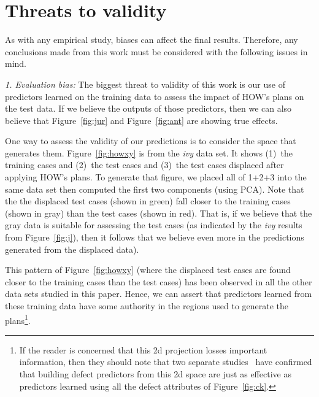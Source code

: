 \documentclass[conference]{IEEEtran}
\newcommand{\fig}[1]{Figure~\ref{fig:#1}}
\begin{document}
\section{Threats to validity}

 

As with any empirical study, biases can affect the final results. Therefore, any
conclusions made from this work must be considered with the following issues in
mind.


{\em 1. Evaluation bias:} The biggest threat to validity of this work is our use
of predictors learned on the training data to assess the impact of HOW's plans
on the test data.
If we believe the outputs of those predictors, then we can also believe that
\fig{jur} and \fig{ant} are showing true effects.  

One way to assess the validity of our predictions is to consider the space that generates
them. \fig{howxy} is from the {\em ivy} data
set. It shows (1)~the training cases and (2)~the test cases and (3)~the
test cases displaced after applying HOW's plans.
To generate that figure, we placed all of 1+2+3 into the same data set then computed the first
two  components (using PCA). Note that the  the   displaced test
cases  (shown in green)  fall closer to the training cases (shown in gray) than
the test cases (shown in red).  That is, if we believe
that the gray data is  suitable for assessing
the test cases (as indicated by the {\em ivy} results from \fig{j}), then it follows
that we believe even more in the predictions
generated from the displaced data).

This pattern of \fig{howxy} (where the displaced test cases are found closer to  the training cases than the test cases) has been observed in all the other data sets studied in this
paper. Hence,  we can assert that
predictors learned from these training data have some authority in the regions
used to generate the plans\footnote{If the reader is concerned that this 2d projection
losses important information, then they should note that two separate  studies~\cite{papa13,divya15}
have confirmed that building defect predictors from this 2d space are just as effective
as predictors learned using all the defect attributes of \fig{ck}.}. 
\end{document}

